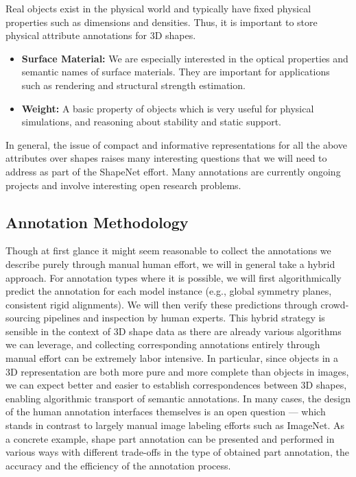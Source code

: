  Real objects exist in the physical world and typically have fixed physical properties such as dimensions and densities.  Thus, it is important to store physical attribute annotations for 3D shapes.
\begin{itemize}
\item \textbf{Surface Material:} We are especially interested in the optical properties and semantic names of surface materials. They are important for applications such as rendering and structural strength estimation.
\item \textbf{Weight:} A basic property of objects which is very useful for physical simulations, and reasoning about stability and static support.
\end{itemize}

In general, the issue of compact and informative representations for all the above attributes over shapes raises many interesting questions that we will need to address as part of the ShapeNet effort.  Many annotations are currently ongoing projects and involve interesting open research problems.

\subsection{Annotation Methodology}

Though at first glance it might seem reasonable to collect the annotations we describe purely through manual human effort, we will in general take a hybrid approach.  For annotation types where it is possible, we will first algorithmically predict the annotation for each model instance (e.g., global symmetry planes, consistent rigid alignments).  We will then verify these predictions through crowd-sourcing pipelines and inspection by human experts.  This hybrid strategy is sensible in the context of 3D shape data as there are already various algorithms we can leverage, and collecting corresponding annotations entirely through manual effort can be extremely labor intensive.  In particular, since objects in a 3D representation are both more pure and more complete than objects in images, we can expect better and easier to establish correspondences between 3D shapes, enabling algorithmic transport of semantic annotations.  In many cases, the design of the human annotation interfaces themselves is an open question --- which stands in contrast to largely manual image labeling efforts such as ImageNet.  As a concrete example, shape part annotation can be presented and performed in various ways with different trade-offs in the type of obtained part annotation, the accuracy and the efficiency of the annotation process.

